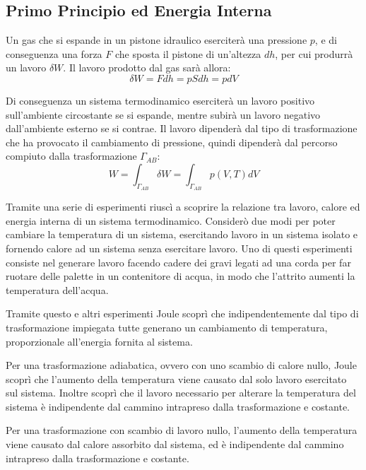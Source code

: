 \documentclass{article}
\numberwithin{equation}{subsection}
\begin{document}
\subsection{Primo Principio ed Energia Interna}
Un gas che si espande in un pistone idraulico eserciterà una pressione $p$, e di conseguenza una forza $F$ 
che sposta il pistone di un'altezza $dh$, per cui produrrà un lavoro $\delta W$. 
Il lavoro prodotto dal gas sarà allora:
\begin{equation}
    \delta W=Fdh=pSdh=pdV
\end{equation}



Di conseguenza un sistema termodinamico eserciterà un lavoro positivo
sull'ambiente circostante se si espande, mentre subirà un 
lavoro negativo dall'ambiente esterno se si contrae. 
Il lavoro dipenderà dal tipo di trasformazione che ha provocato il cambiamento di pressione, quindi dipenderà dal percorso compiuto dalla trasformazione $\Gamma_{AB}$:
\begin{equation}
    W=\int_{\Gamma_{AB}}\delta W=\int_{\Gamma_{AB}}p(V,T)dV
\end{equation}


Tramite una serie di esperimenti riuscì 
a scoprire la relazione tra lavoro, calore ed energia interna di un sistema termodinamico. 
Considerò due modi per poter cambiare la temperatura di un 
sistema, esercitando lavoro in un sistema isolato e fornendo 
calore ad un sistema senza esercitare lavoro. Uno di questi 
esperimenti consiste nel generare lavoro facendo cadere dei 
gravi legati ad una corda per far ruotare delle palette in 
un contenitore di acqua, in modo che l'attrito aumenti la temperatura dell'acqua. 


Tramite questo e altri esperimenti Joule scoprì che indipendentemente dal tipo di trasformazione  
impiegata tutte generano un cambiamento di temperatura, proporzionale all'energia fornita al sistema. 


Per una trasformazione adiabatica, ovvero con uno scambio di calore nullo, Joule scoprì che l'aumento della 
temperatura viene causato dal solo lavoro esercitato sul sistema. Inoltre scoprì 
che il lavoro necessario per alterare la temperatura del sistema è 
indipendente dal cammino intrapreso dalla trasformazione e 
costante. 



Per una trasformazione con scambio di lavoro nullo, l'aumento 
della temperatura viene causato dal calore assorbito dal 
sistema, ed è indipendente dal cammino intrapreso dalla trasformazione 
e costante.
\end{document}
